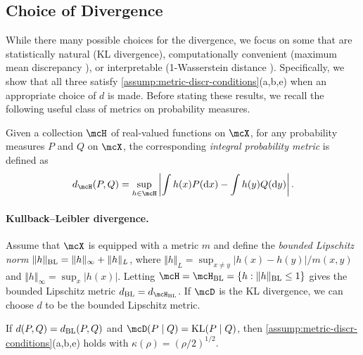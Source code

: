 \subsection{Choice of Divergence} \label{sec:divergence-choice}


While there many possible choices for the divergence, we focus on some that are statistically natural (KL divergence), computationally convenient (maximum mean discrepancy \citep[MMD; ][]{Sriperumbudur:2010}), or interpretable (1-Wasserstein distance \citep{Villani:2009}).
Specifically, we show that all three satisfy \cref{assump:metric-discr-conditions}(a,b,e) when an appropriate choice of $d$ is made.
Before stating these results, we recall the following useful class of metrics on probability measures.
\begin{definition}
	Given a collection $\mcH$ of real-valued functions on $\mcX$,
	for any probability measures $P$ and $Q$ on $\mcX$,
	the corresponding \emph{integral probability metric} is defined as
	\[ \label{eq:IPM}
		d_{\mcH}(P,Q) = \sup_{h \in \mcH}\left|\int h(x)P(\dee x) - \int h(y) Q(\dee y)\right|.
	\]
\end{definition}
\paragraph{Kullback--Leibler divergence.}
Assume that $\mcX$ is equipped with a metric $m$ and define the \emph{bounded Lipschitz norm}
$\Vert h \Vert_{\mathrm{BL}} = \Vert h \Vert_{\infty} + \Vert h \Vert_{L}$, where $\Vert{h}\Vert_{L} = \sup_{x \ne y}|h(x) - h(y)|/m(x, y)$
and $\Vert{h}\Vert_{\infty} = \sup_{x} |h(x)|$.
Letting $\mcH = \mcH_{\mathrm{BL}} = \{h : \Vert h \Vert_{\mathrm{BL}}\le 1\}$ gives the bounded Lipschitz metric
$\blmetric = d_{\mcH_{\mathrm{BL}}}$.
If $\mcD$ is the KL divergence, we can choose $d$ to be the bounded Lipschitz metric.
\begin{proposition} 	\label{coro:KL}
	If $d(P, Q) = d_\mathrm{BL}(P,Q)$ and $\mcD(P \mid Q) = \kl{P}{Q}$, then
	\cref{assump:metric-discr-conditions}(a,b,e) holds with $\kappa(\rho) = (\rho/2)^{1/2}$.
\end{proposition}

